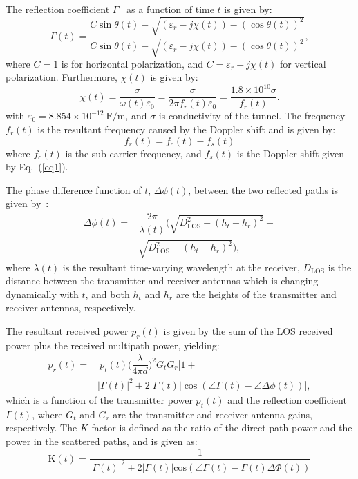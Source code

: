 The reflection coefficient $\Gamma$~\cite{booklter16} as a function of time $t$ is given by:
\begin{equation}
\Gamma(t) = \dfrac{C\sin\theta(t)-\sqrt{(\varepsilon_r-j\chi(t))-(\cos\theta(t))^2}}{C\sin\theta(t)-\sqrt{(\varepsilon_r-j\chi(t))-(\cos\theta(t))^2}},
\end{equation}
where $C = 1$ is for horizontal polarization, and $C = \varepsilon_r-j\chi(t)$ for vertical polarization. Furthermore, $\chi(t)$ is given by:
\begin{equation}
\chi(t) = \dfrac{\sigma}{\omega(t)\varepsilon_0} = \dfrac{\sigma}{2\pi f_r(t) \varepsilon_0} = \dfrac{1.8\times 10^{10}\sigma}{f_r(t)}.
\end{equation}
with $\varepsilon_0 = 8.854\times 10^{-12}~\textrm{F/m}$, and $\sigma$ is conductivity of the tunnel. The frequency $f_r(t)$ is the resultant frequency caused by the Doppler shift and is given by:
\begin{equation}
f_r(t) = f_c(t)-f_s(t)
\end{equation}
where $f_c(t)$ is the sub-carrier frequency, and $f_s(t)$ is the Doppler shift given by Eq.~(\ref{eq1}).

The phase difference function of $t$, $\Delta\phi(t)$, between the two reflected paths is given by~\cite{booklter11}:
\begin{equation}
\begin{split}
\Delta\phi(t) =& \dfrac{2\pi}{\lambda(t)}\bigg(\sqrt{D_{\textrm{LOS}}^2+(h_t+h_r)^2}-\\
& \sqrt{D_{\textrm{LOS}}^2+(h_t-h_r)^2}\bigg),
\end{split}
\end{equation}
where $\lambda(t)$ is the resultant time-varying wavelength at the receiver, $D_{\textrm{LOS}}$ is the distance between the transmitter and receiver antennas which is changing dynamically with $t$, and both $h_t$ and $h_r$ are the heights of the transmitter and receiver antennas, respectively.
 
The resultant received power $p_r(t)$ is given by the sum of the LOS received power plus the received multipath power, yielding:
\begin{equation}
\begin{split}
p_r(t) =& ~p_t(t)\bigg(\dfrac{\lambda}{4\pi d}\bigg)^2G_t G_r\bigg[1+\\
& |\Gamma(t)|^2+2|\Gamma(t)|\cos(\angle\Gamma(t)-\angle\Delta\phi(t))\bigg],
\end{split}
\end{equation}
which is a function of the transmitter power $p_t(t)$ and the reflection coefficient $\Gamma(t)$, where $G_t$ and $G_r$ are the transmitter and receiver antenna gains,  respectively.
The $K$-factor is defined as the ratio of the direct path power and the power in the scattered paths, and is given as:
\begin{equation}
\label{kfactor}
\mathrm{K}(t) = \dfrac{1}{|\Gamma(t)|^2+2|\Gamma(t)|\textrm{cos}(\angle \Gamma(t)-\Gamma(t)\Delta\Phi(t))}
\end{equation}

